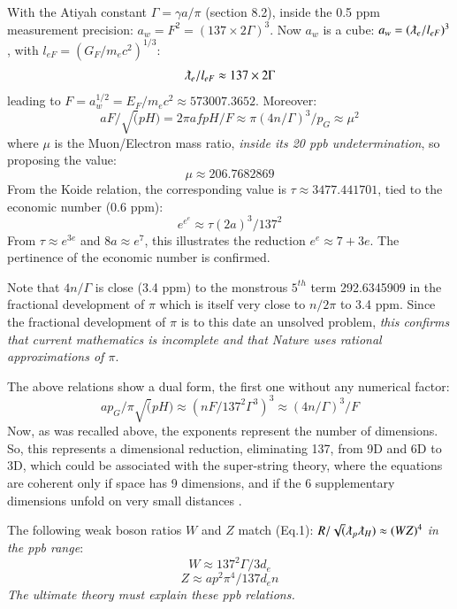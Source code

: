 \documentclass[twoside,draft]{article}
\begin{document}
\begin{sloppypar}
 With the Atiyah constant $\Gamma = \gamma a/\pi$ (section 8.2), inside the 0.5 ppm measurement precision:  
 $a_{w} = F^2 = (137 \times 2 \Gamma)^{3}$. Now $a_{w}$ is a cube: $a_{w} = (\lambdabar_{e}/l_{eF})^{3}$, with $l_{eF} = (G_{F}/m_{e} c^{2})^{1/3}$:    
\begin{equation}
\lambdabar_e/l_{eF} \approx 137 \times 2\Gamma
\end{equation}
leading to $F = a_{w}^{1/2} = E_{F} /m_{e} c^{2} \approx 573007.3652$. Moreover:
\begin{equation}
aF/\sqrt(pH) = 2\pi afpH/F \approx \pi(4n/\Gamma)^3/p_G \approx \mu^2
\end{equation}
where $\mu$ is the Muon/Electron mass ratio, \textit{inside its 20 ppb undetermination}, so proposing the value:
\begin{equation}
\mu \approx 206.7682869
\end{equation}
From the Koide relation, the corresponding value is $\tau \approx 3477.441701$, tied to the economic number (0.6 ppm):
\begin{equation}
e^{e^e} \approx \tau (2a)^3/137^2
\end{equation}
From $\tau \approx e^{3e}$ and $8a \approx e^7$, this illustrates the reduction $e^e \approx 7 + 3e$. The pertinence of the economic number is confirmed.

Note that $4n/\Gamma$ is close (3.4 ppm) to the monstrous $5^{th}$ term 292.6345909 in
the fractional development of $\pi$ which is itself very close to $n/2\pi$ to 3.4 ppm. Since the fractional
development of $\pi$ is to this date an unsolved problem, \textit{this confirms that current mathematics is
incomplete and that Nature uses rational approximations of $\pi$}.

The above relations show a dual form, the first one without any numerical factor:
\begin{equation}
ap_{G} / \pi \sqrt(pH) \approx (n F/137^{2} \Gamma^{3} )^{3} \approx (4n/ \Gamma)^{3}/F
\end{equation}
Now,
 as was recalled above, the exponents represent the number of
dimensions. So, this represents a dimensional reduction, eliminating 137, from 9D and 6D to
3D, which could be associated with the super-string theory, where the equations are coherent only if space
has 9 dimensions, and if the 6 supplementary dimensions unfold on very small distances \cite{Polchinski}.


The following weak boson ratios $W$ and $Z$ match (Eq.1):
$R/\sqrt(\lambdabar_{p} \lambdabar_{H} ) \approx (WZ)^{4}$
\textit{in the ppb range}: 
\begin{equation}
W \approx 137^{2} \Gamma / 3d_{e}
\end{equation}
\begin{equation}
Z \approx ap^{2} \pi^{4} / 137 d_{e} n
\end{equation}
\textit{The ultimate theory must explain these ppb relations.}



\end{sloppypar}
\end{document}
